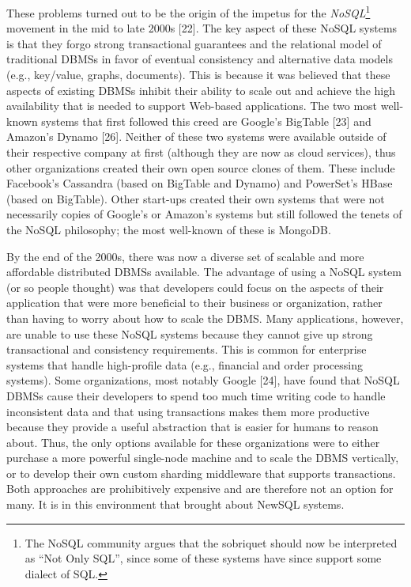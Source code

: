 \documentclass[a4paper,12pt,notitlepage,twoside,openright]{article}
\begin{document}
These problems turned out to be the origin of the impetus for the
\emph{NoSQL}\footnote{The NoSQL community argues that the sobriquet
  should now be interpreted as ``Not Only SQL'', since some of these
  systems have since support some dialect of SQL.} movement in the mid
to late 2000s {[}22{]}. The key aspect of these NoSQL systems is that
they forgo strong transactional guarantees and the relational model of
traditional DBMSs in favor of eventual consistency and alternative data
models (e.g., key/value, graphs, documents). This is because it was
believed that these aspects of existing DBMSs inhibit their ability to
scale out and achieve the high availability that is needed to support
Web-based applications. The two most well-known systems that first
followed this creed are Google's BigTable {[}23{]} and Amazon's Dynamo
{[}26{]}. Neither of these two systems were available outside of their
respective company at first (although they are now as cloud services),
thus other organizations created their own open source clones of them.
These include Facebook's Cassandra (based on BigTable and Dynamo) and
PowerSet's HBase (based on BigTable). Other start-ups created their own
systems that were not necessarily copies of Google's or Amazon's systems
but still followed the tenets of the NoSQL philosophy; the most
well-known of these is MongoDB.

By the end of the 2000s, there was now a diverse set of scalable and
more affordable distributed DBMSs available. The advantage of using a
NoSQL system (or so people thought) was that developers could focus on
the aspects of their application that were more beneficial to their
business or organization, rather than having to worry about how to scale
the DBMS. Many applications, however, are unable to use these NoSQL
systems because they cannot give up strong transactional and consistency
requirements. This is common for enterprise systems that handle
high-profile data (e.g., financial and order processing systems). Some
organizations, most notably Google {[}24{]}, have found that NoSQL DBMSs
cause their developers to spend too much time writing code to handle
inconsistent data and that using transactions makes them more productive
because they provide a useful abstraction that is easier for humans to
reason about. Thus, the only options available for these organizations
were to either purchase a more powerful single-node machine and to scale
the DBMS vertically, or to develop their own custom sharding middleware
that supports transactions. Both approaches are prohibitively expensive
and are therefore not an option for many. It is in this environment that
brought about NewSQL systems.
\end{document}
